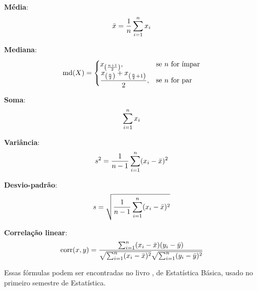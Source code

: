 \documentclass[
    12pt,                  %
    openright,             %
    oneside,               %
    a4paper,               %
    chapter=TITLE,         %
    section=TITLE,         %
    brazil                 %
]{abntex2}                 %
\begin{document}
\textbf{Média}:
\begin{equation}
\bar{x} = \dfrac{1}{n}\sum_{i=1}^{n} x_{i}
\label{eq:media}
\addcontentsline{toc}{subsection}{Equação \theequation: Média Aritmética}
\end{equation}

\textbf{Mediana}:
\begin{equation}
\text{md}(X) =
\begin{cases}
x_{\left( \frac{n+1}{2} \right)}, & \text{se } n \text{ for ímpar} \\
\dfrac{x_{\left( \frac{n}{2} \right)} + x_{\left( \frac{n}{2} + 1 \right)}}{2}, & \text{se } n \text{ for par}
\end{cases}
\label{eq:mediana}
\addcontentsline{toc}{subsection}{Equação \theequation: Mediana}
\end{equation}

\textbf{Soma}:
\begin{equation}
\sum_{i=1}^n x_i
\label{eq:soma}
\addcontentsline{toc}{subsection}{Equação \theequation: Soma}
\end{equation}

\textbf{Variância}:
\begin{equation}
s^2 = \dfrac{1}{n - 1} \sum_{i=1}^{n} (x_i - \bar{x})^2
\label{eq:variancia}
\addcontentsline{toc}{subsection}{Equação \theequation: Variância}
\end{equation}

\textbf{Desvio-padrão}:
\begin{equation}
s = \sqrt{ \dfrac{1}{n - 1} \sum_{i=1}^{n} (x_i - \bar{x})^2 }
\label{eq:desviopadrao}
\addcontentsline{toc}{subsection}{Equação \theequation: Desvio padrão}
\end{equation}

\textbf{Correlação linear}:
\begin{equation}
\text{corr}(x, y) = \dfrac{ \sum_{i=1}^{n} (x_i - \bar{x})(y_i - \bar{y}) }{ \sqrt{ \sum_{i=1}^{n} (x_i - \bar{x})^2 } \sqrt{ \sum_{i=1}^{n} (y_i - \bar{y})^2 } }
\label{eq:correlacao}
\addcontentsline{toc}{subsection}{Equação \theequation: Correlação}
\end{equation}

\noindent Essas fórmulas podem ser encontradas no livro \cite{Bussab2017Cap3}, de Estatística Básica, usado no primeiro semestre de Estatística.

\newpage
\end{document}
